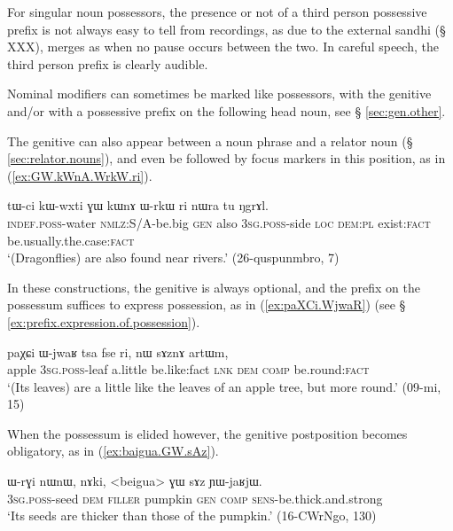 For singular noun possessors, the presence or not of a third person possessive prefix  is not always easy to tell from recordings, as due to the external sandhi (§ XXX),  merges as  when no pause occurs between the two. In careful speech, the third person prefix is clearly audible.

Nominal modifiers can sometimes be marked like possessors, with the genitive and/or with a possessive prefix on the following head noun, see § \ref{sec:gen.other}. 

The genitive can also appear between a noun phrase and a relator noun (§ \ref{sec:relator.nouns}), and even be followed by focus markers in this position, as in (\ref{ex:GW.kWnA.WrkW.ri}).

\begin{exe}
\ex \label{ex:GW.kWnA.WrkW.ri}
\gll   tɯ-ci kɯ-wxti ɣɯ kɯnɤ ɯ-rkɯ ri nɯra tu ŋgrɤl.  \\
\textsc{indef}.\textsc{poss}-water \textsc{nmlz}:S/A-be.big \textsc{gen} also \textsc{3sg}.\textsc{poss}-side \textsc{loc} \textsc{dem}:\textsc{pl} exist:\textsc{fact} be.usually.the.case:\textsc{fact} \\
\glt `(Dragonflies) are also found near rivers.' (26-quspunmbro, 7)
\end{exe}

In these constructions, the genitive is always optional, and the prefix on the possessum suffices to express possession, as in (\ref{ex:paXCi.WjwaR}) (see § \ref{ex:prefix.expression.of.possession}).

\begin{exe}
\ex \label{ex:paXCi.WjwaR}
\gll paχɕi ɯ-jwaʁ tsa fse ri, nɯ sɤznɤ artɯm,\\
apple \textsc{3sg}.\textsc{poss}-leaf a.little be.like:fact \textsc{lnk} \textsc{dem} \textsc{comp} be.round:\textsc{fact} \\
\glt `(Its leaves) are a little like the leaves of an apple tree, but more round.' (09-mi, 15)
\end{exe}

When the possessum is elided however, the genitive postposition becomes obligatory, as in (\ref{ex:baigua.GW.sAz}).

\begin{exe}
\ex \label{ex:baigua.GW.sAz}
\gll ɯ-rɣi nɯnɯ, nɤki, <beigua> ɣɯ sɤz ɲɯ-jaʁjɯ. \\
\textsc{3sg}.\textsc{poss}-seed \textsc{dem} \textsc{filler}  pumpkin \textsc{gen} \textsc{comp} \textsc{sens}-be.thick.and.strong \\
\glt `Its seeds are thicker than those of the pumpkin.' (16-CWrNgo, 130)
\end{exe}

